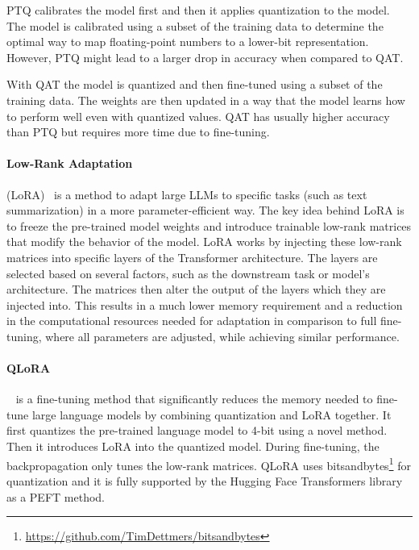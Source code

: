 \documentclass[english, ba, kiv, he, iso690numb, pdf, viewonly]{fasthesis}
\begin{document}
PTQ calibrates the model first and then it applies quantization to the model. The model is calibrated using a subset of the training data to determine the optimal way to map floating-point numbers to a lower-bit representation. However, PTQ might lead to a larger drop in accuracy when compared to QAT.

With QAT the model is quantized and then fine-tuned using a subset of the training data. The weights are then updated in a way that the model learns how to perform well even with quantized values. QAT has usually higher accuracy than PTQ but requires more time due to fine-tuning.
\paragraph{Low-Rank Adaptation}\label{impl:lora}
 (LoRA)~\cite{hu2021lora} is a method to adapt large LLMs to specific tasks (such as text summarization) in a more parameter-efficient way. The key idea behind LoRA is to freeze the pre-trained model weights and introduce trainable low-rank matrices that modify the behavior of the model. LoRA works by injecting these low-rank matrices into specific layers of the Transformer architecture. The layers are selected based on several factors, such as the downstream task or model's architecture. The matrices then alter the output of the layers which they are injected into. This results in a much lower memory requirement and a reduction in the computational resources needed for adaptation in comparison to full fine-tuning, where all parameters are adjusted, while achieving similar performance.
\paragraph{QLoRA}
~\cite{dettmers2023qlora} is a fine-tuning method that significantly reduces the memory needed to fine-tune large language models by combining quantization and LoRA together. It first quantizes the pre-trained language model to 4-bit using a novel method. Then it introduces LoRA into the quantized model. During fine-tuning, the backpropagation only tunes the low-rank matrices. QLoRA uses bitsandbytes\footnote{\url{https://github.com/TimDettmers/bitsandbytes}} for quantization and it is fully supported by the Hugging Face Transformers library as a PEFT method.
\end{document}
